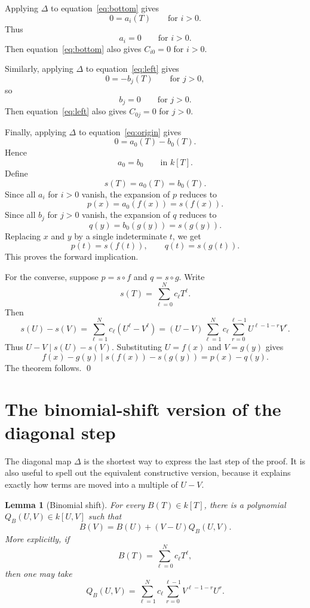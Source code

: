 \documentclass[11pt]{article}
\theoremstyle{plain}
\newtheorem{lemma}[theorem]{Lemma}
\theoremstyle{definition}
\theoremstyle{remark}
\newcommand{\U}{U}
\newcommand{\V}{V}
\newcommand{\TT}{T}
\begin{document}
Applying \(\Delta\) to equation~\eqref{eq:bottom} gives
\[
    0=a_i(\TT)
    \qquad
    \text{for } i>0.
\]
Thus
\[
    a_i=0
    \qquad
    \text{for } i>0.
\]
Then equation~\eqref{eq:bottom} also gives \(C_{i0}=0\) for \(i>0\).

Similarly, applying \(\Delta\) to equation~\eqref{eq:left} gives
\[
    0=-b_j(\TT)
    \qquad
    \text{for } j>0,
\]
so
\[
    b_j=0
    \qquad
    \text{for } j>0.
\]
Then equation~\eqref{eq:left} also gives \(C_{0j}=0\) for \(j>0\).

Finally, applying \(\Delta\) to equation~\eqref{eq:origin} gives
\[
    0=a_0(\TT)-b_0(\TT).
\]
Hence
\[
    a_0=b_0
    \qquad
    \text{in } k[\TT].
\]
Define
\[
    s(\TT)=a_0(\TT)=b_0(\TT).
\]
Since all \(a_i\) for \(i>0\) vanish, the expansion of \(p\) reduces to
\[
    p(x)=a_0(f(x))=s(f(x)).
\]
Since all \(b_j\) for \(j>0\) vanish, the expansion of \(q\) reduces to
\[
    q(y)=b_0(g(y))=s(g(y)).
\]
Replacing \(x\) and \(y\) by a single indeterminate \(t\), we get
\[
    p(t)=s(f(t)),
    \qquad
    q(t)=s(g(t)).
\]
This proves the forward implication.

For the converse, suppose \(p=s\circ f\) and \(q=s\circ g\). Write
\[
    s(T)=\sum_{\ell=0}^N c_\ell T^\ell.
\]
Then
\[
    s(\U)-s(\V)
    =
    \sum_{\ell=1}^N c_\ell(\U^\ell-\V^\ell)
    =
    (\U-\V)
    \sum_{\ell=1}^N c_\ell\sum_{r=0}^{\ell-1}\U^{\ell-1-r}\V^r.
\]
Thus \(\U-\V\mid s(\U)-s(\V)\). Substituting \(\U=f(x)\) and \(\V=g(y)\) gives
\[
    f(x)-g(y)
    \mid
    s(f(x))-s(g(y))
    =
    p(x)-q(y).
\]
The theorem follows. \qed

\section{The binomial-shift version of the diagonal step}

The diagonal map \(\Delta\) is the shortest way to express the last step of the proof. It is also useful to spell out the equivalent constructive version, because it explains exactly how terms are moved into a multiple of \(\U-\V\).

\begin{lemma}[Binomial shift]\label{lem:binomial-shift}
For every \(B(T)\in k[T]\), there is a polynomial \(Q_B(\U,\V)\in k[\U,\V]\) such that
\[
    B(\V)=B(\U)+(\V-\U)Q_B(\U,\V).
\]
More explicitly, if
\[
    B(T)=\sum_{\ell=0}^N c_\ell T^\ell,
\]
then one may take
\[
    Q_B(\U,\V)
    =
    \sum_{\ell=1}^N c_\ell
    \sum_{r=0}^{\ell-1} \V^{\ell-1-r}\U^r.
\]
\end{lemma}
\end{document}
